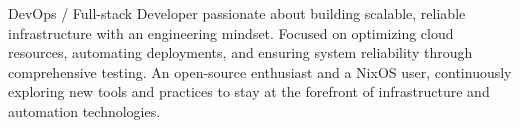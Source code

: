 

\begin{cvparagraph}

DevOps / Full-stack Developer passionate about building scalable, reliable infrastructure with an engineering mindset. Focused on optimizing cloud resources, automating deployments, and ensuring system reliability through comprehensive testing. An open-source enthusiast and a NixOS user, continuously exploring new tools and practices to stay at the forefront of infrastructure and automation technologies.
\end{cvparagraph}
